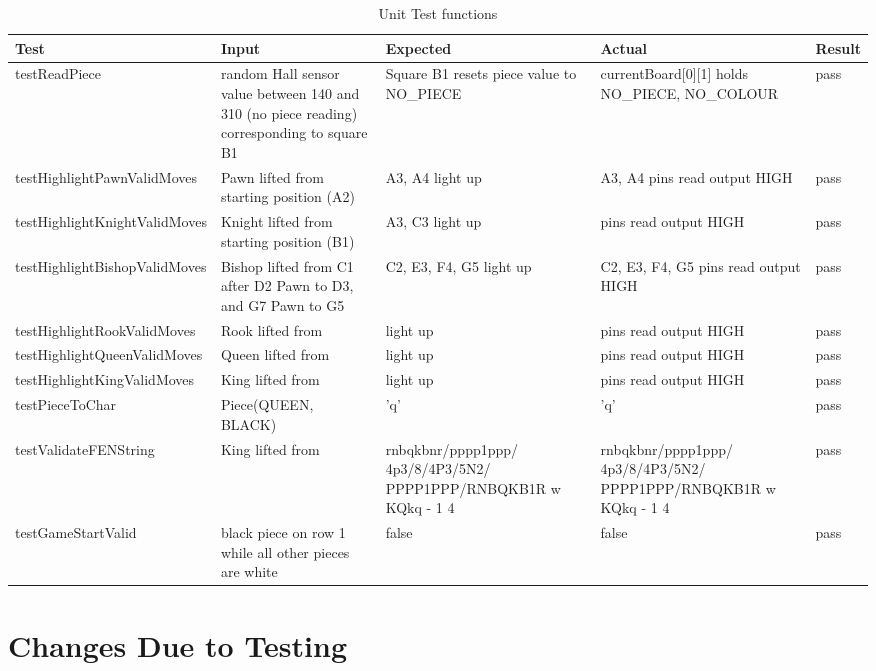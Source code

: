 \documentclass[12pt, titlepage]{article}
\begin{document}
\begin{table}[H]
  \centering
    \setlength{\leftmargini}{0cm}
    \begin{tabular}{| >{\centering\arraybackslash}m{6cm} | 
        >{\centering\arraybackslash}m{4cm} | 
        >{\centering\arraybackslash}m{3.5cm} | 
        >{\centering\arraybackslash}m{3.5cm} |
        >{\centering\arraybackslash}m{1.5cm} |}
    \hline
    \rowcolor[gray]{0.9}
    Test & Input & Expected & Actual & Result\\
    \hline
    testReadPiece & random Hall sensor value between 140 and 310 (no piece reading) corresponding to square B1 & Square B1 resets piece value to NO\_PIECE & currentBoard[0][1] holds NO\_PIECE, NO\_COLOUR  & pass \\
    \hline
    testHighlightPawnValidMoves & Pawn lifted from starting position (A2) & A3, A4 light up & A3, A4 pins read output HIGH & pass \\
    \hline
    testHighlightKnightValidMoves & Knight lifted from starting position (B1)& A3, C3 light up & pins read output HIGH & pass \\
    \hline
    testHighlightBishopValidMoves & Bishop lifted from C1 after D2 Pawn to D3, and G7 Pawn to G5 & C2, E3, F4, G5 light up & C2, E3, F4, G5 pins read output HIGH & pass \\
    \hline
    testHighlightRookValidMoves & Rook lifted from & light up & pins read output HIGH & pass \\
    \hline
    testHighlightQueenValidMoves & Queen lifted from & light up & pins read output HIGH & pass \\
    \hline
    testHighlightKingValidMoves & King lifted from & light up & pins read output HIGH & pass \\
    \hline
    testPieceToChar & Piece(QUEEN, BLACK) & 'q' & 'q' & pass \\
    \hline
    testValidateFENString & King lifted from & {\scriptsize rnbqkbnr/pppp1ppp/ 4p3/8/4P3/5N2/ PPPP1PPP/RNBQKB1R w KQkq - 1 4} & {\scriptsize rnbqkbnr/pppp1ppp/ 4p3/8/4P3/5N2/ PPPP1PPP/RNBQKB1R w KQkq - 1 4} & pass \\
    \hline
    testGameStartValid & black piece on row 1 while all other pieces are white & false & false & pass \\
    \hline
    \end{tabular}
  \caption{Unit Test functions}
\end{table}

\section{Changes Due to Testing}
\end{document}
